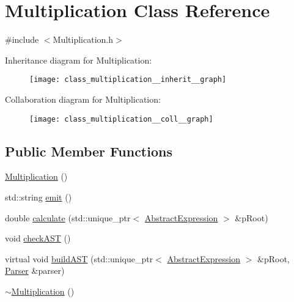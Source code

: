 \hypertarget{class_multiplication}{}\section{Multiplication Class Reference}
\label{class_multiplication}


{\ttfamily \#include $<$Multiplication.\+h$>$}



Inheritance diagram for Multiplication\+:
\nopagebreak
\begin{figure}[H]
\begin{center}
\leavevmode
\texttt{[image: class\_multiplication\_\_inherit\_\_graph]}
\end{center}
\end{figure}


Collaboration diagram for Multiplication\+:
\nopagebreak
\begin{figure}[H]
\begin{center}
\leavevmode
\texttt{[image: class\_multiplication\_\_coll\_\_graph]}
\end{center}
\end{figure}
\subsection*{Public Member Functions}
\begin{DoxyCompactItemize}
\item 
\mbox{\hyperlink{class_multiplication_a814ccc71b369d0d0b947722a0a24c42e}{Multiplication}} ()
\item 
std\+::string \mbox{\hyperlink{class_multiplication_aa3d4776c71313acdc380b801ecee792b}{emit}} ()
\item 
double \mbox{\hyperlink{class_multiplication_a2d82ad71d5bb01c3fc3bab1240db9031}{calculate}} (std\+::unique\+\_\+ptr$<$ \mbox{\hyperlink{class_abstract_expression}{Abstract\+Expression}} $>$ \&p\+Root)
\item 
void \mbox{\hyperlink{class_multiplication_ad6f64d9672c75a25030af352f855309e}{check\+A\+ST}} ()
\item 
virtual void \mbox{\hyperlink{class_multiplication_a0bf6680544c5d519ae23597696938a2a}{build\+A\+ST}} (std\+::unique\+\_\+ptr$<$ \mbox{\hyperlink{class_abstract_expression}{Abstract\+Expression}} $>$ \&p\+Root, \mbox{\hyperlink{class_parser}{Parser}} \&parser)
\item 
\mbox{\hyperlink{class_multiplication_ae81a978764f3a1578d1e659a1bbf6485}{$\sim$\+Multiplication}} ()
\end{DoxyCompactItemize}
